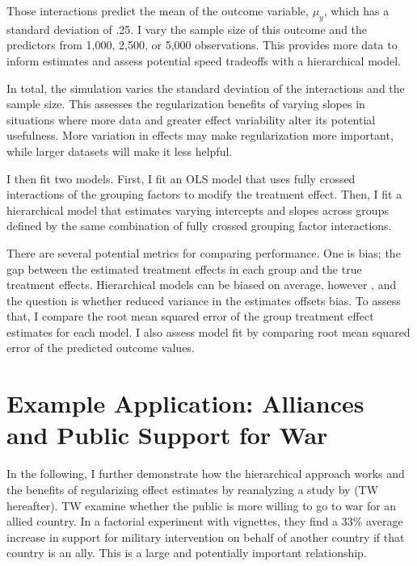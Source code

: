 \documentclass[12pt]{article}
\begin{document}
Those interactions predict the mean of the outcome variable, $\mu_y$, which has a standard deviation of .25. 
I vary the sample size of this outcome and the predictors from 1,000, 2,500, or 5,000 observations. 
This provides more data to inform estimates and assess potential speed tradeoffs with a hierarchical model.


In total, the simulation varies the standard deviation of the interactions and the sample size. 
This assesses the regularization benefits of varying slopes in situations where more data and greater effect variability alter its potential usefulness.
More variation in effects may make regularization more important, while larger datasets will make it less helpful.


I then fit two models. 
First, I fit an OLS model that uses fully crossed interactions of the grouping factors to modify the treatment effect.
Then, I fit a hierarchical model that estimates varying intercepts and slopes across groups defined by the same combination of fully crossed grouping factor interactions.


There are several potential metrics for comparing performance. 
One is bias; the gap between the estimated treatment effects in each group and the true treatment effects. 
Hierarchical models can be biased on average, however \citep{CliffordRainey2024}, and the question is whether reduced variance in the estimates offsets bias. 
To assess that, I compare the root mean squared error of the group treatment effect estimates for each model.
I also assess model fit by comparing root mean squared error of the predicted outcome values. 




\section{Example Application: Alliances and Public Support for War} 


In the following, I further demonstrate how the hierarchical approach works and the benefits of regularizing effect estimates by reanalyzing a study by \citet{TomzWeeks2021} (TW hereafter). 
TW examine whether the public is more willing to go to war for an allied country.
In a factorial experiment with vignettes, they find a 33\% average increase in support for military intervention on behalf of another country if that country is an ally. 
This is a large and potentially important relationship. 
\end{document}
